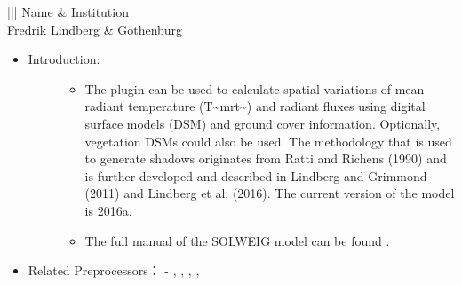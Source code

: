 \documentclass[letterpaper,10pt,english]{sphinxmanual}
\begin{document}
\begin{savenotes}\sphinxattablestart
\centering
\begin{tabular}[t]{|||}
\hline
\sphinxstyletheadfamily 
Name
&\sphinxstyletheadfamily 
Institution
\\
\hline
Fredrik Lindberg
&
Gothenburg
\\
\hline
\end{tabular}
\par
\sphinxattableend\end{savenotes}
\begin{itemize}
\item {} \begin{description}
\item[{Introduction:}] \leavevmode\begin{itemize}
\item {} 
The  plugin can be used to calculate spatial variations of mean radiant temperature (T\textasciitilde{}mrt\textasciitilde{}) and radiant fluxes using digital surface models (DSM) and ground cover information. Optionally, vegetation DSMs could also be used. The methodology that is used to generate shadows originates from Ratti and Richens (1990) and is further developed and described in Lindberg and Grimmond (2011) and Lindberg et al. (2016). The current version of the model is 2016a.

\item {} 
The full manual of the SOLWEIG model can be found .

\end{itemize}

\end{description}

\item {} 
Related Preprocessors：
- {\hyperref[\detokenize{pre-processor/Meteorological Data MetPreprocessor:metpreprocessor}]{}}, {\hyperref[\detokenize{pre-processor/Meteorological Data Download data (WATCH):watch}]{}}, {\hyperref[\detokenize{pre-processor/Urban Geometry Sky View Factor Calculator:skyviewfactorcalculator}]{}}, {\hyperref[\detokenize{pre-processor/Urban Geometry Wall Height and Aspect:wallheightandaspect}]{}}, {\hyperref[\detokenize{pre-processor/Urban Land Cover Land Cover Reclassifier:landcoverreclassifier}]{}}


\end{itemize}
\end{document}

